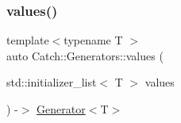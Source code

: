 \mbox{\label{namespace_catch_1_1_generators_abd89db7c0024d0ea5715a3cd6336214c}} 
\subsubsection{\texorpdfstring{values()}{values()}}
{\footnotesize\ttfamily template$<$typename T $>$ \\
auto Catch\+::\+Generators\+::values (\begin{DoxyParamCaption}\item[{std\+::initializer\+\_\+list$<$ T $>$}]{values }\end{DoxyParamCaption}) -\/$>$ \mbox{\hyperlink{class_catch_1_1_generators_1_1_generator}{Generator}}$<$T$>$ }

